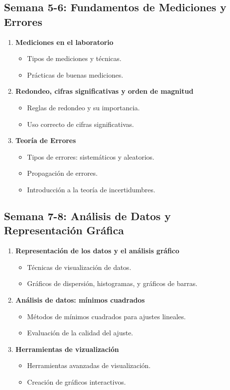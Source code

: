 \documentclass{article}
\begin{document}
\subsection*{Semana 5-6: Fundamentos de Mediciones y Errores}
\begin{enumerate}
    \item \textbf{Mediciones en el laboratorio}
    \begin{itemize}
        \item Tipos de mediciones y técnicas.
        \item Prácticas de buenas mediciones.
    \end{itemize}
    \item \textbf{Redondeo, cifras significativas y orden de magnitud}
    \begin{itemize}
        \item Reglas de redondeo y su importancia.
        \item Uso correcto de cifras significativas.
    \end{itemize}
    \item \textbf{Teoría de Errores}
    \begin{itemize}
        \item Tipos de errores: sistemáticos y aleatorios.
        \item Propagación de errores.
        \item Introducción a la teoría de incertidumbres.
    \end{itemize}
\end{enumerate}

\subsection*{Semana 7-8: Análisis de Datos y Representación Gráfica}
\begin{enumerate}
    \item \textbf{Representación de los datos y el análisis gráfico}
    \begin{itemize}
        \item Técnicas de visualización de datos.
        \item Gráficos de dispersión, histogramas, y gráficos de barras.
    \end{itemize}
    \item \textbf{Análisis de datos: mínimos cuadrados}
    \begin{itemize}
        \item Métodos de mínimos cuadrados para ajustes lineales.
        \item Evaluación de la calidad del ajuste.
    \end{itemize}
    \item \textbf{Herramientas de vizualización}
    \begin{itemize}
        \item Herramientas avanzadas de visualización.
        \item Creación de gráficos interactivos.
    \end{itemize}
\end{enumerate}
\end{document}
